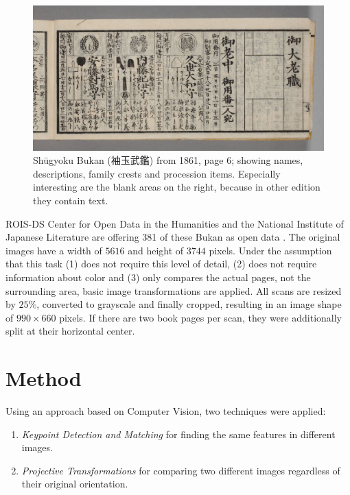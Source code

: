 \documentclass{ltjarticle}
\begin{document}
\begin{figure}
    \centering
    \includegraphics[width=\textwidth]{200019500_00006}
    \caption[Shūgyoku Bukan (袖玉武鑑), page 6]{Shūgyoku Bukan (袖玉武鑑) from 1861, page 6; showing names, descriptions, family crests and procession items. Especially interesting are the blank areas on the right, because in other edition they contain text.}
    \label{fig:shuugyokubukan006}
\end{figure}

ROIS-DS Center for Open Data in the Humanities and the National Institute of Japanese Literature are offering 381 of these Bukan as open data \cite{pmjt} \cite{codh2018bukan}. The original images have a width of $5616$ and height of $3744$ pixels. Under the assumption that this task (1) does not require this level of detail, (2) does not require information about color and (3) only compares the actual pages, not the surrounding area, basic image transformations are applied. All scans are resized by $25\%$, converted to grayscale and finally cropped, resulting in an image shape of $990 \times 660$ pixels. If there are two book pages per scan, they were additionally split at their horizontal center.

\section{Method}

Using an approach based on Computer Vision, two techniques were applied:

\begin{enumerate}
    \item \emph{Keypoint Detection and Matching} for finding the same features in different images.
    \item \emph{Projective Transformations} for comparing two different images regardless of their original orientation.
\end{enumerate}
\end{document}

